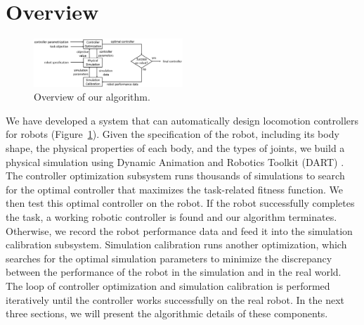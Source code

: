 \section{Overview}

\begin{figure}[!t]
  \centering
  \includegraphics[width=0.5\textwidth]{figures/controllerTransfer}
  \caption{Overview of our algorithm.}
  \vspace{-0.1in}
  \label{fig:controllerTransferOverview}
\end{figure}

We have developed a system that can automatically design locomotion controllers for robots (Figure~\ref{fig:controllerTransferOverview}). Given the specification of the robot, including its body shape, the physical properties of each body, and the types of joints, we build a physical simulation using Dynamic Animation and Robotics Toolkit (DART) \cite{dart:2012}. The controller optimization subsystem runs thousands of simulations to search for the optimal controller that maximizes the task-related fitness function. We then test this optimal controller on the robot. If the robot successfully completes the task, a working robotic controller is found and our algorithm terminates. Otherwise, we record the robot performance data and feed it into the simulation calibration subsystem. Simulation calibration runs another optimization, which searches for the optimal simulation parameters to minimize the discrepancy between the performance of the robot in the simulation and in the real world. The loop of controller optimization and simulation calibration is performed iteratively until the controller works successfully on the real robot. In the next three sections, we will present the algorithmic details of these components.
